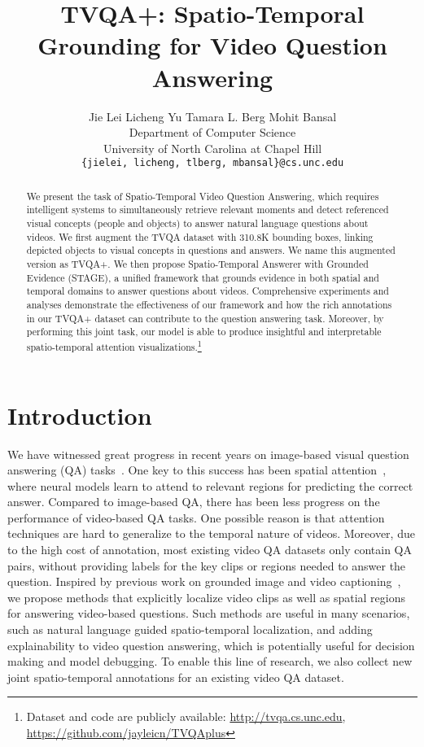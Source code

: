 \documentclass[11pt,a4paper]{article}
\title{TVQA+: Spatio-Temporal Grounding for Video Question Answering}
\author{
  Jie Lei  Licheng Yu  
  Tamara L. Berg  Mohit Bansal \\
  Department of Computer Science \\ University of North Carolina at Chapel Hill \\
  {\tt \{jielei, licheng, tlberg, mbansal\}@cs.unc.edu} \\
}
\begin{document}
\maketitle
\begin{abstract}
We present the task of Spatio-Temporal Video Question Answering, which requires intelligent systems to simultaneously retrieve relevant moments and detect referenced visual concepts (people and objects) to answer natural language questions about videos. 
We first augment the TVQA dataset 
with 310.8K bounding boxes, linking depicted objects to visual concepts in questions and answers.
We name this augmented version as TVQA+.
We then propose Spatio-Temporal Answerer with Grounded Evidence (STAGE), a unified framework that grounds evidence in both spatial and temporal domains to answer questions about videos.
Comprehensive experiments and analyses demonstrate the effectiveness of our framework and how the rich annotations in our TVQA+ dataset can contribute to the question answering task.
Moreover, by performing this joint task, our model is able to produce insightful and interpretable spatio-temporal attention visualizations.\footnote{Dataset and code are publicly available: \url{http://tvqa.cs.unc.edu}, \url{https://github.com/jayleicn/TVQAplus}}
\end{abstract}


\section{Introduction}\label{intro}

We have witnessed great progress in recent years on image-based visual question answering (QA) tasks~\cite{Antol2015VQAVQ,Yu2015VisualMF,Zhu2016Visual7WGQ}.
One key to this success has been spatial attention~\cite{Anderson2017BottomUpAT,Shih2016WhereTL,Lu2016HierarchicalQC}, where neural models learn to attend to relevant regions for predicting the correct answer.
Compared to image-based QA, there has been less progress on the performance of video-based QA tasks.
One possible reason is that attention techniques are hard to generalize to the temporal nature of videos.
Moreover, due to the high cost of annotation, most existing video QA datasets only contain QA pairs, without providing labels for the key clips or regions needed to answer the question.
Inspired by previous work on grounded image and video captioning~\cite{Lu2018NeuralBT,Zhou2018GroundedVD}, we propose methods that explicitly localize video clips as well as spatial regions for answering video-based questions. 
Such methods are useful in many scenarios, such as natural language guided spatio-temporal localization, and adding explainability to video question answering, which is potentially useful for decision making and model debugging.
To enable this line of research, we also collect new joint spatio-temporal annotations for an existing video QA dataset.
\end{document}
